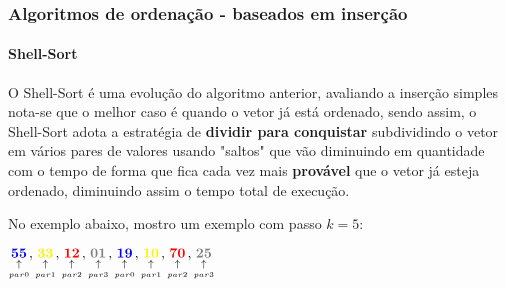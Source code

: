 \begin{frame}
	\frametitle{Algoritmos de ordenação - baseados em inserção}
	\framesubtitle{Shell-Sort}
	\par O Shell-Sort é uma evolução do algoritmo anterior, avaliando a inserção simples nota-se que o melhor caso é quando o vetor já está ordenado, sendo assim, o Shell-Sort adota a estratégia de \textbf{dividir para conquistar} subdividindo o vetor em vários pares de valores usando "saltos" que vão diminuindo em quantidade com o tempo de forma que fica cada vez mais \textbf{provável} que o vetor já esteja ordenado, diminuindo assim o tempo total de execução.\newline
	\par No exemplo abaixo, mostro um exemplo com passo $k=5$:

	\par $
	\apontar{par0}{\textcolor{blue}{55}}, 
	\apontar{par1}{\textcolor{yellow}{33}}, 
	\apontar{par2}{\textcolor{red}{12}},  
	\apontar{par3}{\textcolor{gray}{01}}, 
	\apontar{par0}{\textcolor{blue}{19}}, 
	\apontar{par1}{\textcolor{yellow}{10}},
	\apontar{par2}{\textcolor{red}{70}}, 
	\apontar{par3}{\textcolor{gray}{25}} 
	$
\end{frame}


